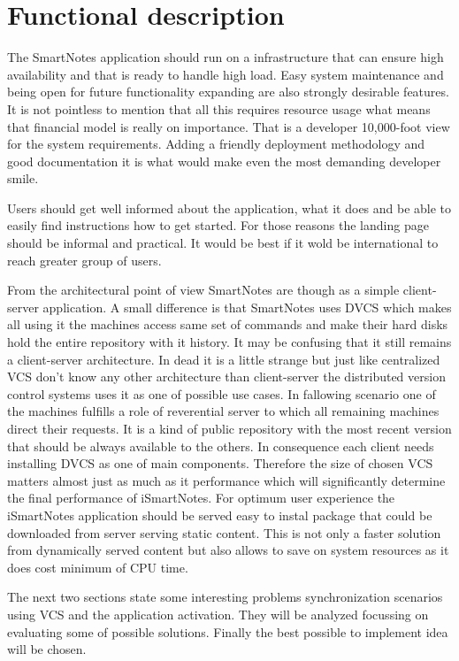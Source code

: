 \section{Functional description}\label{sec:functional_descr}
The SmartNotes application should run on a infrastructure that can ensure high availability and that is ready to handle high load. Easy system maintenance and being open for future functionality expanding are also strongly desirable features. It is not pointless to mention that all this requires resource usage what means that financial model is really on importance. That is a developer 10,000-foot view for the system requirements. Adding a friendly deployment methodology and good documentation it is what would make even the most demanding developer smile.

Users should get well informed about the application, what it does and be able to easily find instructions how to get started. For those reasons the landing page should be informal and practical. It would be best if it wold be international to reach greater group of users.

From the architectural point of view SmartNotes are though as a simple client-server application. A small difference is that SmartNotes uses DVCS which makes all using it the machines access same set of commands and make their hard disks hold the entire repository with it history. It may be confusing that it still remains a client-server architecture. In dead it is a little strange but just like centralized VCS don't know any other architecture than client-server the distributed version control systems uses it as one of possible use cases. In fallowing scenario one of the machines fulfills a role of reverential server to which all remaining machines direct their requests. It is a kind of public repository with the most recent version that should be always available to the others. In consequence each client needs installing DVCS as one of main components. Therefore the size of chosen VCS matters almost just as much as it performance which will significantly determine the final performance of iSmartNotes. For optimum user experience the iSmartNotes application should be served easy to instal package that could be downloaded from server serving static content. This is not only a faster solution from dynamically served content but also allows to save on system resources as it does cost minimum of CPU time.

The next two sections state some interesting problems synchronization scenarios using VCS and the application activation. They will be analyzed focussing on evaluating some of possible solutions. Finally the best possible to implement idea will be chosen.  
 
